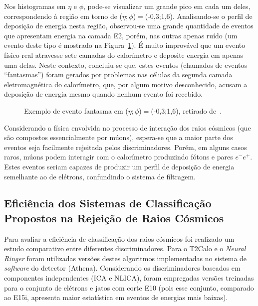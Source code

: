 Nos histogramas em $\eta$ e $\phi$, pode-se visualizar
um grande pico em cada um deles, correspondendo à região em torno
de ($\eta;\phi$)$=$(-0,3;1,6). Analisando-se o perfil de deposição
de energia nesta região, observou-se uma grande quantidade de
eventos que apresentam energia na camada E2, porém, nas outras
apenas ruído (um evento deste tipo é mostrado na
Figura~\ref{fig_cosmic_fant}). É muito improvável que um evento
físico real atravesse sete camadas do calorímetro e deposite
energia em apenas uma delas. Neste contexto, concluiu-se que,
estes eventos (chamados de eventos ``fantasmas'') foram gerados
por problemas nas células da segunda camada eletromagnética do
calorímetro, que, por algum motivo desconhecido, acusam a
deposição de energia mesmo quando nenhum evento foi recebido.

\begin{figure}[h!]
\begin{minipage}[b]{0.98\linewidth}
  \centering
 \centerline{}
\end{minipage}
\caption[Exemplo de evento fantasma em
($\eta;\phi$)$=$(-0,3;1,6).]{Exemplo de evento fantasma em
($\eta;\phi$)$=$(-0,3;1,6), retirado
de~\cite{tese:torres:2010}.}\label{fig_cosmic_fant}
\end{figure}

Considerando a física envolvida no processo de interação dos raios cósmicos (que são compostos essencialmente por
múons), espera-se que a maior parte
dos eventos seja facilmente rejeitada pelos discriminadores. Porém, em alguns casos raros,
múons podem interagir com o calorímetro produzindo fótons e pares $e^-e^+$. Estes
eventos seriam capazes de produzir um perfil de deposição de energia semelhante ao de elétrons, confundindo o
sistema de filtragem.

\subsection{Eficiência dos Sistemas de Classificação Propostos na Rejeição de Raios Cósmicos}

Para avaliar a eficiência de classificação dos raios cósmicos foi realizado um estudo comparativo entre
diferentes discriminadores. Para o T2Calo e o \emph{Neural Ringer} foram utilizadas versões destes algoritmos
implementadas no sistema de \emph{software} do detector (Athena). Considerando os discriminadores
baseados em componentes independentes (ICA e NLICA), foram empregadas versões treinadas para o conjunto
de elétrons e jatos com corte E10 (pois esse conjunto, comparado ao E15i, apresenta maior estatística em
eventos de energias mais baixas).

